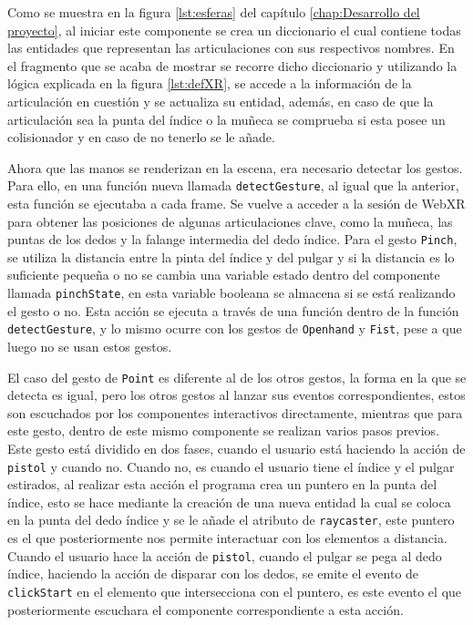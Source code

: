 \documentclass[a4paper, 12pt]{book}
\begin{document}
Como se muestra en la figura \ref{lst:esferas} del capítulo \ref{chap:Desarrollo del proyecto}, al iniciar este componente se crea un diccionario el cual contiene todas las entidades que representan las articulaciones con sus respectivos nombres. En el fragmento que se acaba de mostrar se recorre dicho diccionario y utilizando la lógica explicada en la figura \ref{lst:defXR}, se accede a la información de la articulación en cuestión y se actualiza su entidad, además, en caso de que la articulación sea la punta del índice o la muñeca se comprueba si esta posee un colisionador y en caso de no tenerlo se le añade.

Ahora que las manos se renderizan en la escena, era necesario detectar los gestos. Para ello, en una función nueva llamada \texttt{detectGesture}, al igual que la anterior, esta función se ejecutaba a cada frame. Se vuelve a acceder a la sesión de WebXR para obtener las posiciones de algunas articulaciones clave, como la muñeca, las puntas de los dedos y la falange intermedia del dedo índice.
Para el gesto \texttt{Pinch}, se utiliza la distancia entre la pinta del índice y del pulgar y si la distancia es lo suficiente pequeña o no se cambia una variable estado dentro del componente llamada \texttt{pinchState}, en esta variable booleana se almacena si se está realizando el gesto o no. Esta acción se ejecuta a través de una función dentro de la función \texttt{detectGesture}, y lo mismo ocurre con los gestos de \texttt{Openhand} y \texttt{Fist}, pese a que luego no se usan estos gestos. 

El caso del gesto de \texttt{Point} es diferente al de los otros gestos, la forma en la que se detecta es igual, pero los otros gestos al lanzar sus eventos correspondientes, estos son escuchados por los componentes interactivos directamente, mientras que para este gesto,
dentro de este mismo componente se realizan varios pasos previos. Este gesto está dividido en dos fases, cuando el usuario está haciendo la acción de \texttt{pistol} y cuando no. Cuando no, es cuando el usuario tiene el índice y el pulgar estirados, al realizar esta acción el programa crea un puntero en la punta del índice, esto se hace mediante la creación de una nueva entidad la cual se coloca en la punta del dedo índice y se le añade el atributo de \texttt{raycaster}, este puntero es el que posteriormente nos permite interactuar con los elementos a distancia. Cuando el usuario hace la acción de \texttt{pistol}, cuando el pulgar se pega al dedo índice, haciendo la acción de disparar con los dedos, se emite el evento de \texttt{clickStart} en el elemento que intersecciona con el puntero, es este evento el que posteriormente escuchara el componente correspondiente a esta acción. 
\end{document}
